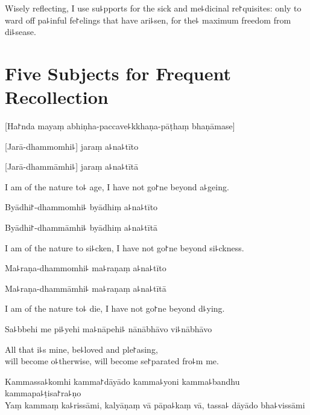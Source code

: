 \begin{english}
  Wisely reflecting, I use su꜕pports for the sick and me꜕dicinal re꜓quisites: only to ward off pa꜕inful fe꜓elings that have ari꜕sen, for the꜕ maximum freedom from di꜕sease.
\end{english}

\chapter[Five Subjects]{Five Subjects for Frequent Recollection}%


\begin{leader}
  [Ha꜓nda mayaṃ abhiṇha-paccave꜕kkhaṇa-pāṭhaṃ bhaṇāmase]
\end{leader}

%
[Jarā-dhammomhi꜕] jaraṃ a꜕na꜕tīto

%
[Jarā-dhammāmhi꜕] jaraṃ a꜕na꜕tītā

\begin{english}
  I am of the nature to꜕ age, I have not go꜓ne beyond a꜕geing.
\end{english}

%
Byādhi꜓-dhammomhi꜕ byādhiṃ a꜕na꜕tīto

%
Byādhi꜓-dhammāmhi꜕ byādhiṃ a꜕na꜕tītā

\begin{english}
  I am of the nature to si꜕cken, I have not go꜓ne beyond si꜕ckness.
\end{english}

%
Ma꜕raṇa-dhammomhi꜕ ma꜕raṇaṃ a꜕na꜕tīto

%
Ma꜕raṇa-dhammāmhi꜕ ma꜕raṇaṃ a꜕na꜕tītā

\begin{english}
  I am of the nature to꜕ die, I have not go꜓ne beyond d꜕ying.
\end{english}

Sa꜕bbehi me pi꜕yehi ma꜕nāpehi꜕ nānābhāvo vi꜕nābhāvo

\begin{english}
  All that i꜕s mine, be꜕loved and ple꜓asing,\\
  will become o꜕therwise, will become se꜓parated fro꜕m me.
\end{english}

%
Kammassa꜕komhi kamma꜓dāyādo kamma꜕yoni kamma꜕bandhu kammapa꜕ṭisa꜓ra꜕ṇo\\
Yaṃ kammaṃ ka꜕rissāmi, kalyāṇaṃ vā pāpa꜕kaṃ vā, tassa꜕ dāyādo bha꜕vissāmi

